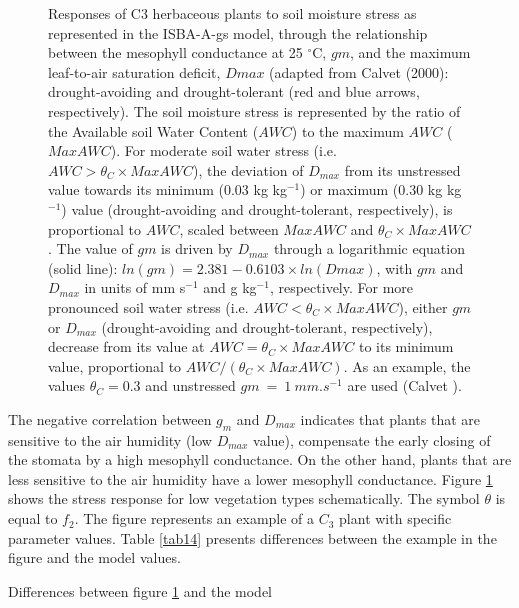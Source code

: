 {\begin{figure}[h]
\hspace*{2.cm}
\begin{center}
\caption{Responses of C3 herbaceous plants to soil moisture stress
as represented in the ISBA-A-gs model, through the relationship
between the mesophyll conductance at 25 $^{\circ}$C, $gm$, and the maximum
leaf-to-air saturation deficit, $Dmax$ (adapted from Calvet (2000): 
drought-avoiding and drought-tolerant (red and blue arrows,
respectively). The soil moisture stress is represented by the ratio of the
Available soil Water Content ($AWC$) to the maximum $AWC$ ($MaxAWC$).
For moderate soil water stress (i.e. $AWC > \theta_C \times MaxAWC$), 
the deviation of $D_{max}$ from its unstressed value
towards its minimum (0.03 kg kg$^{-1}$) or maximum (0.30 kg kg$^{-1}$)
value (drought-avoiding and drought-tolerant, respectively), is proportional
to $AWC$, scaled between $MaxAWC$ and $\theta_C \times MaxAWC$.
The value of $gm$ is driven by $D_{max}$ through a logarithmic equation
(solid line): $ln(gm)=2.381 - 0.6103 \times ln(Dmax)$, with $gm$ and
$D_{max}$ in units of mm s$^{-1}$ and g kg$^{-1}$, respectively. For more pronounced
soil water stress (i.e. $AWC < \theta_C \times MaxAWC$), either $gm$
or $D_{max}$ (drought-avoiding and drought-tolerant, respectively), decrease
from its value at $AWC = \theta_C \times MaxAWC$ to its minimum
value, proportional to $AWC/(\theta_C \times MaxAWC)$. As an example, the values
$\theta_C = 0.3$ and unstressed $gm~=~1~mm.s^{-1}$ are used (Calvet ).}
\label{stress}
\end{center}
\end{figure}
\nocite{Calvet2012}

The negative correlation between $g_{m}$ and $D_{max}$ indicates that plants that are sensitive to the air
humidity (low $D_{max}$ value), compensate the early closing of the stomata by a high mesophyll
conductance. On the other hand, plants that are less sensitive to the air humidity have a lower
mesophyll conductance. Figure \ref{stress} shows the stress response for low vegetation types schematically.
The symbol $\theta$ is equal to $f_{2}$. The figure represents an example of a $C_{3}$ plant with specific parameter
values. Table \ref{tab14} presents differences between the example in the figure and the model values.

\begin{table}
\caption{Differences between figure \ref{stress} and the model}


\end{table}}
